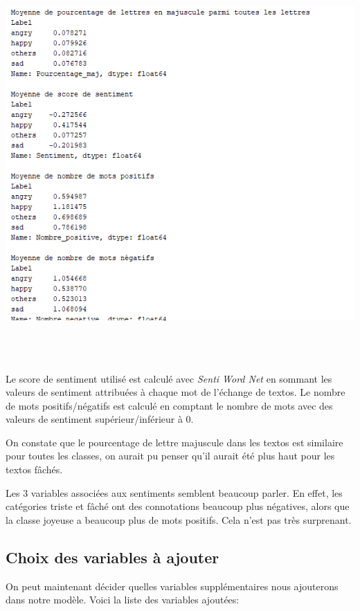 \documentclass[12pt,french]{article}
\begin{document}
\includegraphics[width=\linewidth,height=15cm,keepaspectratio]{analyse_maj_sentiment}

Le score de sentiment utilisé est calculé avec \emph{Senti Word Net} en sommant les valeurs de sentiment attribuées à chaque mot de l'échange de textos. Le nombre de mots positifs/négatifs est calculé en comptant le nombre de mots avec des valeurs de sentiment supérieur/inférieur à 0.

On constate que le pourcentage de lettre majuscule dans les textos est similaire pour toutes les classes, on aurait pu penser qu'il aurait été plus haut pour les textos fâchés. 

Les 3 variables associées aux sentiments semblent beaucoup parler. En effet, les catégories triste et fâché ont des connotations beaucoup plus négatives, alors que la classe joyeuse a beaucoup plus de mots positifs. Cela n'est pas très surprenant.

\subsection*{Choix des variables à ajouter}

On peut maintenant décider quelles variables supplémentaires nous ajouterons dans notre modèle. Voici la liste des variables ajoutées:
\end{document}
